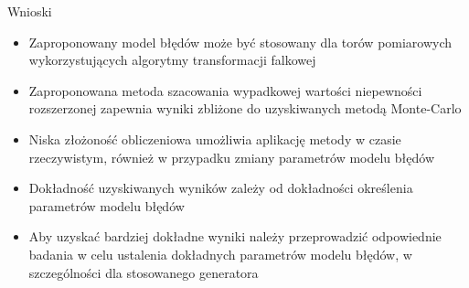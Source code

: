 \documentclass[12pt, polish, aspectratio = 169]{slides}
\begin{document}


\begin{frame}{Wnioski}
\begin{itemize}
\item Zaproponowany model błędów może być stosowany dla torów pomiarowych wykorzystujących algorytmy transformacji falkowej
\item Zaproponowana metoda szacowania wypadkowej wartości niepewności rozszerzonej zapewnia wyniki zbliżone do uzyskiwanych metodą Monte-Carlo
\item Niska złożoność obliczeniowa umożliwia aplikację metody w czasie rzeczywistym, również w przypadku zmiany parametrów modelu błędów
\item Dokładność uzyskiwanych wyników zależy od dokładności określenia parametrów modelu błędów
\item Aby uzyskać bardziej dokładne wyniki należy przeprowadzić odpowiednie badania w celu ustalenia dokładnych parametrów modelu błędów, w szczególności dla stosowanego generatora
\end{itemize}
\end{frame}
\end{document}

